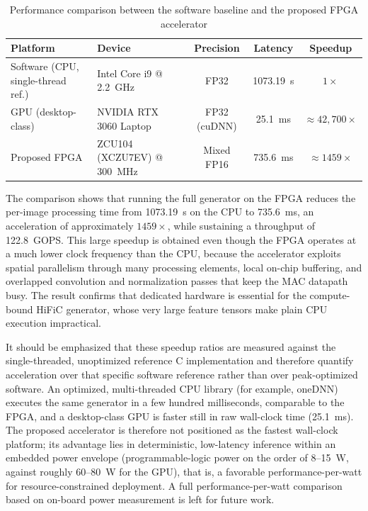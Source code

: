 \begin{table}[H]
    \centering
    \caption{Performance comparison between the software baseline and the proposed FPGA accelerator}
    \label{tab:performance_comparison}
    \begin{tabular}{|>{\raggedright\arraybackslash}p{2.6cm}|>{\raggedright\arraybackslash}p{3.6cm}|c|c|c|}
        \hline
        \textbf{Platform} & \textbf{Device} & \textbf{Precision} & \textbf{Latency} & \textbf{Speedup} \\
        \hline
        Software (CPU, single-thread ref.) & Intel Core i9 @ 2.2~GHz & FP32 & 1073.19~s & $1\times$ \\
        \hline
        GPU (desktop-class) & NVIDIA RTX 3060 Laptop & FP32 (cuDNN) & 25.1~ms & $\approx 42{,}700\times$ \\
        \hline
        Proposed FPGA & ZCU104 (XCZU7EV) @ 300~MHz & Mixed FP16 & 735.6~ms & $\approx 1459\times$ \\
        \hline
    \end{tabular}
\end{table}

The comparison shows that running the full generator on the FPGA reduces the per-image processing time from 1073.19~s on the CPU to 735.6~ms, an acceleration of approximately $1459\times$, while sustaining a throughput of 122.8~GOPS. This large speedup is obtained even though the FPGA operates at a much lower clock frequency than the CPU, because the accelerator exploits spatial parallelism through many processing elements, local on-chip buffering, and overlapped convolution and normalization passes that keep the MAC datapath busy. The result confirms that dedicated hardware is essential for the compute-bound HiFiC generator, whose very large feature tensors make plain CPU execution impractical.

It should be emphasized that these speedup ratios are measured against the single-threaded, unoptimized reference C implementation and therefore quantify acceleration over that specific software reference rather than over peak-optimized software. An optimized, multi-threaded CPU library (for example, oneDNN) executes the same generator in a few hundred milliseconds, comparable to the FPGA, and a desktop-class GPU is faster still in raw wall-clock time (25.1~ms). The proposed accelerator is therefore not positioned as the fastest wall-clock platform; its advantage lies in deterministic, low-latency inference within an embedded power envelope (programmable-logic power on the order of 8--15~W, against roughly 60--80~W for the GPU), that is, a favorable performance-per-watt for resource-constrained deployment. A full performance-per-watt comparison based on on-board power measurement is left for future work.

